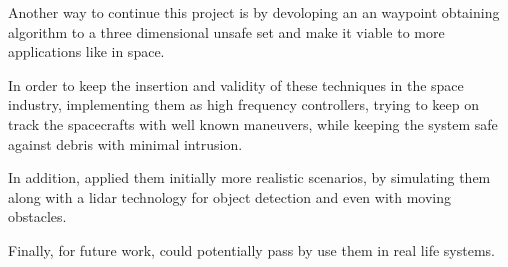 Another way to continue this project is by devoloping an an waypoint obtaining algorithm to a three dimensional unsafe set and make it viable to more applications like in space. 

In order to keep the insertion and validity of these techniques in the space industry, implementing them as high frequency controllers, trying to keep on track the spacecrafts with well known maneuvers, while keeping the system safe against debris with minimal intrusion.  

In addition, applied them initially more realistic scenarios, by simulating them along with a lidar technology for object detection and even with moving obstacles.

Finally, for future work, could potentially pass by use them in real life systems. 